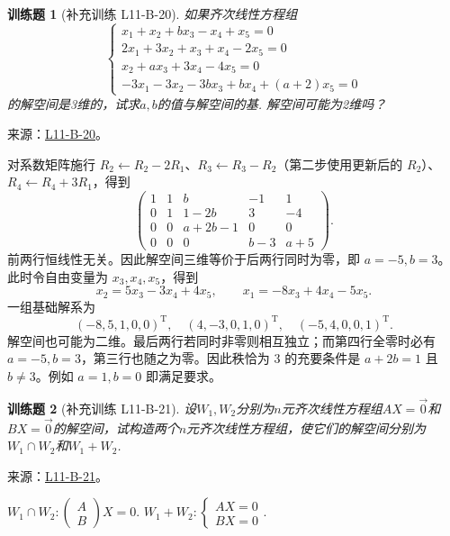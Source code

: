 \documentclass[12pt,fontset=fandol]{ctexart}
\newtheorem{exercise}{训练题}[section]
\begin{document}
\begin{exercise}[补充训练 L11-B-20]\label{prob:L11-B-20}
如果齐次线性方程组\[\begin{cases}
                x_1+x_2+bx_3-x_4+x_5=0   \\
                2x_1+3x_2+x_3+x_4-2x_5=0 \\
                x_2+ax_3+3x_4-4x_5=0     \\
                -3x_1-3x_2-3bx_3+bx_4+(a+2)x_5=0
            \end{cases}\]的解空间是3维的，试求$a,b$的值与解空间的基. 解空间可能为2维吗？
\end{exercise}
\noindent 来源：\href{https://github.com/yhwu-is/Linear-Algebra-Left-Undone/blob/new/%E8%AE%B2%E4%B9%89/%E4%B8%93%E9%A2%98/11%20%E6%9C%9D%E8%8A%B1%E5%A4%95%E6%8B%BE.tex}{L11-B-20}。
\begin{solve}
对系数矩阵施行 $R_2\leftarrow R_2-2R_1$、$R_3\leftarrow R_3-R_2$（第二步使用更新后的 $R_2$）、$R_4\leftarrow R_4+3R_1$，得到
\[\begin{pmatrix}1&1&b&-1&1\\0&1&1-2b&3&-4\\0&0&a+2b-1&0&0\\0&0&0&b-3&a+5\end{pmatrix}.\]
前两行恒线性无关。因此解空间三维等价于后两行同时为零，即 $a=-5,b=3$。此时令自由变量为 $x_3,x_4,x_5$，得到
\[x_2=5x_3-3x_4+4x_5,\qquad x_1=-8x_3+4x_4-5x_5.\]
一组基础解系为
\[(-8,5,1,0,0)^{\mathrm T},\quad(4,-3,0,1,0)^{\mathrm T},\quad(-5,4,0,0,1)^{\mathrm T}.\]
解空间也可能为二维。最后两行若同时非零则相互独立；而第四行全零时必有 $a=-5,b=3$，第三行也随之为零。因此秩恰为 $3$ 的充要条件是 $a+2b=1$ 且 $b\ne3$。例如 $a=1,b=0$ 即满足要求。
\end{solve}

\begin{exercise}[补充训练 L11-B-21]\label{prob:L11-B-21}
设$W_1,W_2$分别为$n$元齐次线性方程组$AX=\vec{0}$和$BX=\vec{0}$的解空间，试构造两个$n$元齐次线性方程组，使它们的解空间分别为$W_1 \cap W_2$和$W_1+W_2$.
\end{exercise}
\noindent 来源：\href{https://github.com/yhwu-is/Linear-Algebra-Left-Undone/blob/new/%E8%AE%B2%E4%B9%89/%E4%B8%93%E9%A2%98/11%20%E6%9C%9D%E8%8A%B1%E5%A4%95%E6%8B%BE.tex}{L11-B-21}。
\begin{solve}
$W_1\cap W_2:\begin{pmatrix}
                  A \\ B
              \end{pmatrix}X=0$. \qquad
          $W_1+ W_2:\begin{cases}
                  AX = 0 \\
                  BX = 0
              \end{cases}$.
\end{solve}
\end{document}
